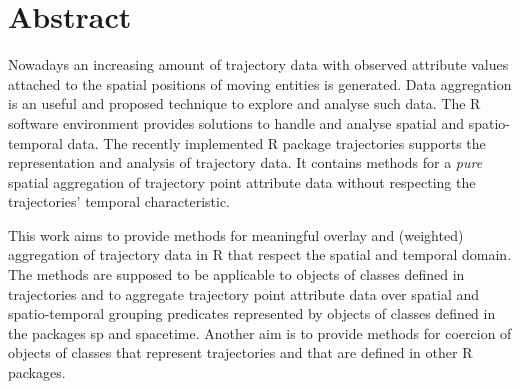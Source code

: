 \documentclass[12pt, oneside, a4paper]{scrbook}
\newcommand{\pkg}[1]{{\normalfont\fontseries{b}\selectfont #1}}
\let\proglang=\textsf
\begin{document}


\maketitle






\frontmatter

\tableofcontents


\listoftables
\begingroup
\let\clearpage\relax
\listoffigures
\endgroup




\chapter{Abstract}


Nowadays an increasing amount of trajectory data with observed attribute values attached to the spatial positions of moving entities is generated.
Data aggregation is an useful and proposed technique to explore and analyse such data.
The \proglang{R} software environment provides solutions to handle and analyse spatial and spatio-temporal data.
The recently implemented \proglang{R} package \pkg{trajectories} supports the representation and analysis of trajectory data. 
It contains methods for a \textit{pure} spatial aggregation of trajectory point attribute data without respecting the trajectories' temporal characteristic.

This work aims to provide methods for meaningful overlay and (weighted) aggregation of trajectory data in \proglang{R} that respect the spatial and temporal domain.
The methods are supposed to be applicable to objects of classes defined in \pkg{trajectories} and to aggregate trajectory point attribute data over spatial and spatio-temporal grouping predicates represented by objects of classes defined in the packages \pkg{sp} and \pkg{spacetime}. 
Another aim is to provide methods for coercion of objects of classes that represent trajectories and that are defined in other \proglang{R} packages.
\end{document}
